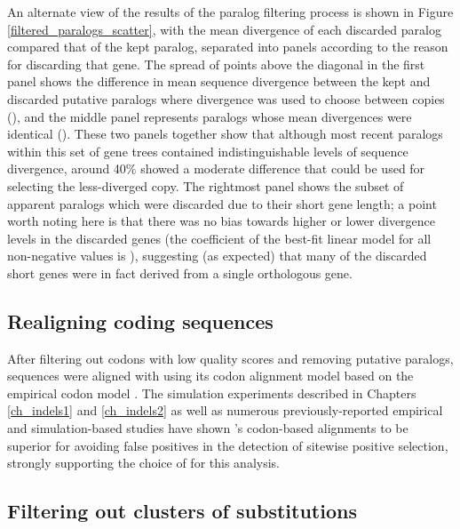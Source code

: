 An alternate view of the results of the paralog filtering process is
shown in Figure \ref{filtered_paralogs_scatter}, with the mean
divergence of each discarded paralog compared that of the kept
paralog, separated into panels according to the reason for discarding
that gene. The spread of points above the diagonal in the first panel
shows the difference in mean sequence divergence between the kept and
discarded putative paralogs where divergence was used to choose
between copies (), and the middle panel represents
paralogs whose mean divergences were identical (). These
two panels together show that although most recent paralogs within
this set of gene trees contained indistinguishable levels of sequence
divergence, around 40\% showed a moderate difference that could be
used for selecting the less-diverged copy. The rightmost panel shows
the subset of apparent paralogs which were discarded due to their
short gene length; a point worth noting here is that there was no bias
towards higher or lower divergence levels in the discarded genes (the
coefficient of the best-fit linear model for all non-negative values
is ), suggesting (as expected) that many of
the discarded short genes were in fact derived from a single
orthologous gene.

\subsection{Realigning coding sequences}

After filtering out codons with low quality scores and removing
putative paralogs, sequences were aligned with \prank
\citep{Loytynoja2008} using its codon alignment model based on the
empirical codon model \citep{Kosiol2007}. The simulation experiments
described in Chapters \ref{ch_indels1} and \ref{ch_indels2} as well as numerous
previously-reported empirical and simulation-based studies have shown
\prank{}'s codon-based alignments to be superior for avoiding false
positives in the detection of sitewise positive selection, strongly
supporting the choice of \prank for this analysis.

\subsection{Filtering out clusters of \nsyn substitutions}


